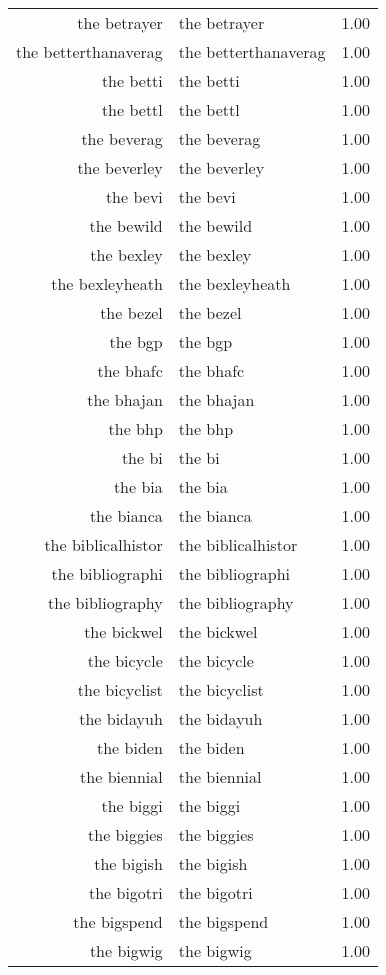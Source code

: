 \begin{table}[ht]
\begin{tabular}{rlr}
  the betrayer & the betrayer & 1.00 \\ 
  the betterthanaverag & the betterthanaverag & 1.00 \\ 
  the betti & the betti & 1.00 \\ 
  the bettl & the bettl & 1.00 \\ 
  the beverag & the beverag & 1.00 \\ 
  the beverley & the beverley & 1.00 \\ 
  the bevi & the bevi & 1.00 \\ 
  the bewild & the bewild & 1.00 \\ 
  the bexley & the bexley & 1.00 \\ 
  the bexleyheath & the bexleyheath & 1.00 \\ 
  the bezel & the bezel & 1.00 \\ 
  the bgp & the bgp & 1.00 \\ 
  the bhafc & the bhafc & 1.00 \\ 
  the bhajan & the bhajan & 1.00 \\ 
  the bhp & the bhp & 1.00 \\ 
  the bi & the bi & 1.00 \\ 
  the bia & the bia & 1.00 \\ 
  the bianca & the bianca & 1.00 \\ 
  the biblicalhistor & the biblicalhistor & 1.00 \\ 
  the bibliographi & the bibliographi & 1.00 \\ 
  the bibliography & the bibliography & 1.00 \\ 
  the bickwel & the bickwel & 1.00 \\ 
  the bicycle & the bicycle & 1.00 \\ 
  the bicyclist & the bicyclist & 1.00 \\ 
  the bidayuh & the bidayuh & 1.00 \\ 
  the biden & the biden & 1.00 \\ 
  the biennial & the biennial & 1.00 \\ 
  the biggi & the biggi & 1.00 \\ 
  the biggies & the biggies & 1.00 \\ 
  the bigish & the bigish & 1.00 \\ 
  the bigotri & the bigotri & 1.00 \\ 
  the bigspend & the bigspend & 1.00 \\ 
  the bigwig & the bigwig & 1.00 \\ 

\end{tabular}
\end{table}
